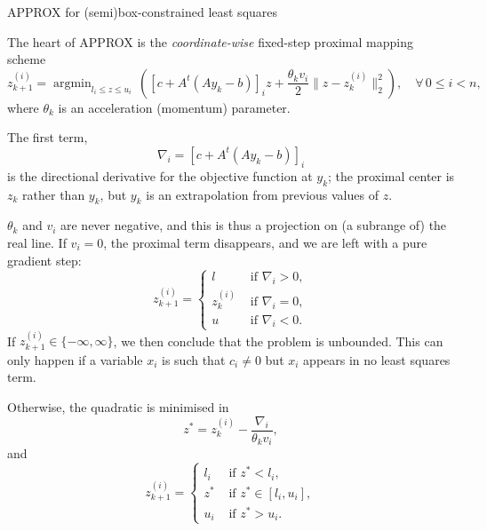 \documentclass{article}
\begin{document}
\begin{algorithm}[h]
\caption{APPROX for (semi)box-constrained least squares}
\begin{algorithmic}
\REPEAT
{}
\end{algorithmic}
\end{algorithm}

The heart of APPROX is the \emph{coordinate-wise} fixed-step proximal
mapping scheme
\[z^{(i)}_{k+1} = \mathop{\arg\min}_{l_i\leq z \leq u_i}\,
\left([c+A^t(A y_k-b)]_i z + \frac{\theta_k v_i}{2}\|z -
  z^{(i)}_k\|_2^2\right),\quad\forall\, 0 \leq i < n,\]
where \(\theta_k\) is an acceleration (momentum) parameter.

The first term, \[\nabla_i = [c+A^t(A y_k-b)]_i\] is the directional derivative
for the objective function at \(y_k\); the proximal center is \(z_k\)
rather than \(y_k\), but \(y_k\) is an extrapolation from previous
values of \(z\).

\(\theta_k\) and \(v_i\) are never negative, and this is thus a
projection on (a subrange of) the real line.  If \(v_i = 0\), the
proximal term disappears, and we are left with a pure gradient step:
\[z^{(i)}_{k+1}=\begin{cases}
              l & \textrm{ if } \nabla_i > 0,\\
              z^{(i)}_{k} & \textrm{ if } \nabla_i = 0,\\
              u & \textrm{ if } \nabla_i < 0.
             \end{cases}\]
If \(z^{(i)}_{k+1}\in\{-\infty,\infty\}\), we then conclude that the
problem is unbounded.  This can only happen if a variable \(x_i\) is
such that \(c_i\neq 0\) but \(x_i\) appears in no least squares term.

Otherwise, the quadratic is minimised in
\[z^* = z^{(i)}_k - \frac{\nabla_i}{\theta_k v_i},\]
and
\[z^{(i)}_{k+1}=\begin{cases}
             l_i & \textrm{ if } z^* < l_i,\\
             z^* &\textrm{ if } z^*\in [l_i, u_i],\\
             u_i &\textrm{ if } z^* > u_i.
             \end{cases}\]
\end{document}
